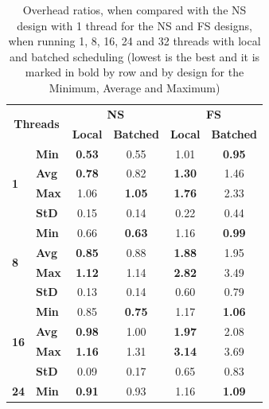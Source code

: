 \documentclass{llncs}
\begin{document}
\setlength{\tabcolsep}{12pt}
\begin{table}[!ht]
\centering
\caption{Overhead ratios, when compared with the NS design with 1
  thread for the NS and FS designs, when running 1, 8, 16, 24 and 32
  threads with local and batched scheduling (lowest is the best and it
  is marked in bold by row and by design for the Minimum, Average and
  Maximum)}
\begin{tabular}{ll|cc|cc}
\hline\hline
\multicolumn{2}{c|}{\multirow{2}{*}{\bf Threads}} &
\multicolumn{2}{c|}{\multirow{1}{*}{\bf NS}} &
\multicolumn{2}{|c}{\multirow{1}{*}{\bf FS}}\\ \cline{3-6}
& 
& \multicolumn{1}{c}{\bf Local}
& \multicolumn{1}{c}{\bf Batched}
& \multicolumn{1}{|c}{\bf Local}
& \multicolumn{1}{c}{\bf Batched}\\
\hline
\multirow{4}{*}{\bf 1}
& {\bf Min }& {\bf 0.53}& 0.55& 1.01& {\bf 0.95}\\
& {\bf Avg }& {\bf 0.78}& 0.82& {\bf 1.30}& 1.46\\
& {\bf Max }& 1.06& {\bf 1.05}& {\bf 1.76}& 2.33\\
& {\bf StD }& 0.15& 0.14& 0.22& 0.44\\
\hline
\multirow{4}{*}{\bf 8}
& {\bf Min }& 0.66& {\bf 0.63}& 1.16&{\bf  0.99}\\
& {\bf Avg }& {\bf 0.85}& 0.88& {\bf 1.88}& 1.95\\
& {\bf Max }& {\bf 1.12}& 1.14& {\bf 2.82}& 3.49\\
& {\bf StD }& 0.13& 0.14& 0.60& 0.79\\
\hline
\multirow{4}{*}{\bf 16}
& {\bf Min }& 0.85& {\bf 0.75}& 1.17& {\bf 1.06}\\
& {\bf Avg }& {\bf 0.98}& 1.00& {\bf 1.97}& 2.08\\
& {\bf Max }& {\bf 1.16}& 1.31& {\bf 3.14}& 3.69\\
& {\bf StD }& 0.09& 0.17& 0.65& 0.83\\
\hline
\multirow{4}{*}{\bf 24}
& {\bf Min }& {\bf 0.91}& 0.93& 1.16& {\bf 1.09}\\

\end{tabular}
\end{table}
\end{document}
